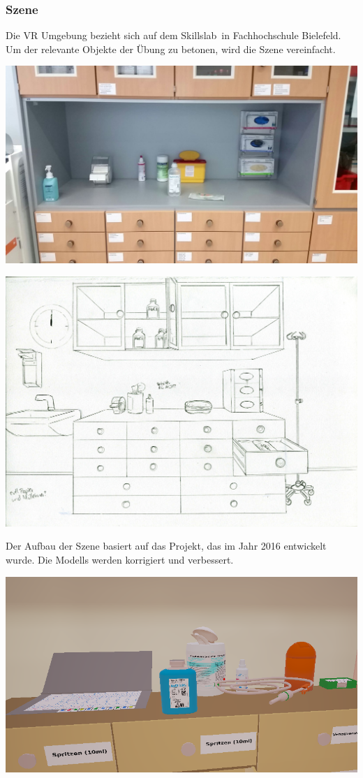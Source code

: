   \subsubsection{Szene}
  Die VR Umgebung bezieht sich auf dem \glqq Skillslab\grqq\ in Fachhochschule Bielefeld. Um der relevante Objekte der Übung zu betonen, wird die Szene vereinfacht.
  
  \includegraphics[width=\textwidth]{images/RealLabor.jpg}
  
  \includegraphics[width=\textwidth]{images/paperPrototype2.jpg}
  
  Der Aufbau der Szene basiert auf das Projekt, das im Jahr 2016 entwickelt wurde\citep{26}. Die Modells werden korrigiert und verbessert.
  
  \includegraphics[width=\textwidth]{images/WithoutGlass.png}


